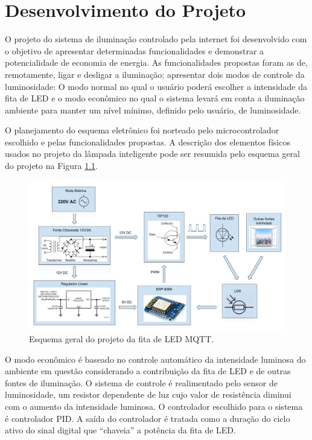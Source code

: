 \chapter{Desenvolvimento do Projeto}

O projeto do sistema de iluminação controlado pela internet foi desenvolvido com o objetivo de apresentar determinadas funcionalidades e demonstrar a potencialidade de economia de energia. As funcionalidades propostas foram as de, remotamente, ligar e desligar a iluminação; apresentar dois modos de controle da luminosidade: O modo normal no qual o usuário poderá escolher a intensidade da fita de LED e o modo econômico no qual o sistema levará em conta a iluminação ambiente para manter um nível mínimo, definido pelo usuário, de luminosidade. 

O planejamento do esquema eletrônico foi norteado pelo microcontrolador escolhido e pelas funcionalidades propostas. A descrição dos elementos físicos usados no projeto da lâmpada inteligente pode ser resumida pelo esquema geral do projeto na Figura \ref{esquema}.

\begin{figure}[ht]
    \begin{center}
    \includegraphics[width=\textwidth]{figuras/esquema_eletrico.jpg}
    \end{center}
    \caption[Esquema geral do projeto da fita de LED MQTT.]{Esquema geral do projeto da fita de LED MQTT.}
    \label{esquema}
\end{figure}

O modo econômico é baseado no controle automático da intensidade luminosa do ambiente em questão considerando a contribuição da fita de LED e de outras fontes de iluminação. O sistema de controle é realimentado pelo sensor de luminosidade, um resistor dependente de luz cujo valor de resistência diminui com o aumento da intensidade luminosa. O controlador escolhido para o sistema é controlador \acf{PID}. A saída do controlador é tratada como a duração do ciclo ativo do sinal digital que ``chaveia'' a potência da fita de LED.


